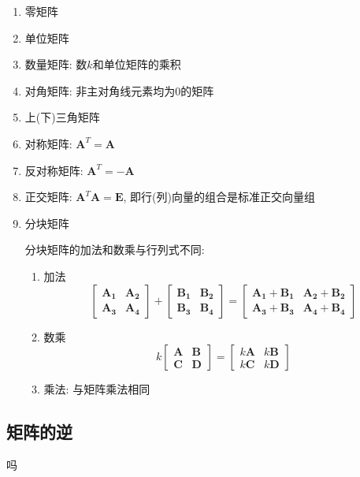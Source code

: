 \begin{enumerate}
	\item 零矩阵
	\item 单位矩阵
	\item 数量矩阵: 数$ k $和单位矩阵的乘积
	\item 对角矩阵: 非主对角线元素均为$ 0 $的矩阵
	\item 上(下)三角矩阵
	\item 对称矩阵: $ \bm{A}^{T}=\bm{A} $
	\item 反对称矩阵: $ \bm{A}^{T}=-\bm{A} $
	\item 正交矩阵: $ \bm{A}^{T}\bm{A}=\bm{E} $, 即行(列)向量的组合是标准正交向量组
	\item 分块矩阵\par
	分块矩阵的加法和数乘与行列式不同:
	\begin{enumerate}
		\item 加法
		\begin{equation*}
			\begin{bmatrix}
				\bm{A_{1}} & \bm{A_{2}} \\ \bm{A_{3}} & \bm{A_{4}}
			\end{bmatrix} + 
		    \begin{bmatrix}
			    \bm{B_{1}} & \bm{B_{2}} \\ \bm{B_{3}} & \bm{B_{4}}
		    \end{bmatrix} = 
	        \begin{bmatrix}
	        	\bm{A_{1}}+\bm{B_{1}} & \bm{A_{2}}+\bm{B_{2}} \\ \bm{A_{3}}+\bm{B_{3}} & \bm{A_{4}}+\bm{B_{4}}
	        \end{bmatrix}
		\end{equation*}
	    \item 数乘
	    \begin{equation*}
	    	k\begin{bmatrix}
	    		\bm{A} & \bm{B} \\ \bm{C} & \bm{D}
	    	\end{bmatrix} = 
    	    \begin{bmatrix}
    	    	k\bm{A} & k\bm{B} \\ k\bm{C} & k\bm{D}
    	    \end{bmatrix}
	    \end{equation*}
        \item 乘法: 与矩阵乘法相同
	\end{enumerate}
\end{enumerate}
\subsection{矩阵的逆}  吗    
